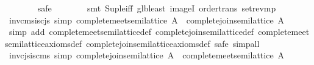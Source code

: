 \begin{isabellebody}
\ \ \ \ \ \ \isamarkupfalse%
\ safe\isanewline
\ \ \ \ \ \ \isamarkupfalse%
\ {}smt\ Sup{}le{}iff\ glb{}least\ imageI\ order{}trans\ set{}rev{}mp{}\isanewline
\ \ \isamarkupfalse%
%
\endisatagproof
{\isafoldproof}%
%
\isadelimproof
\isanewline
%
\endisadelimproof
\isanewline
{}\isamarkupfalse%
\isanewline
\isanewline
{}\isamarkupfalse%
\ inv{}cms{}is{}cjs\ {}simp{}{}\ {}complete{}meet{}semilattice\ {}A{}{}\ {}\ complete{}join{}semilattice\ A{}\isanewline
%
\isadelimproof
\ \ %
\endisadelimproof
%
\isatagproof
{}\isamarkupfalse%
\ {}simp\ add{}\ complete{}meet{}semilattice{}def\ complete{}join{}semilattice{}def\ complete{}meet{}semilattice{}axioms{}def\ complete{}join{}semilattice{}axioms{}def{}\ safe{}\ simp{}all{}%
\endisatagproof
{\isafoldproof}%
%
\isadelimproof
\isanewline
%
\endisadelimproof
\isanewline
{}\isamarkupfalse%
\ inv{}cjs{}is{}cms\ {}simp{}{}\ {}complete{}join{}semilattice\ {}A{}{}\ {}\ complete{}meet{}semilattice\ A{}\isanewline

\end{isabellebody}

